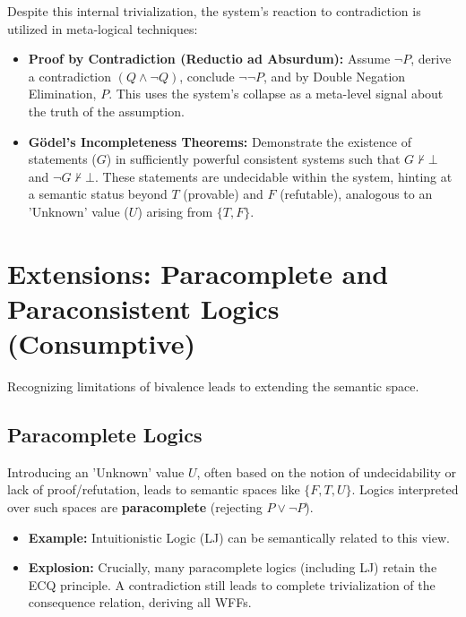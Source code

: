 	Despite this internal trivialization, the system's reaction to contradiction is utilized in meta-logical techniques:
	\begin{itemize}
		\item \textbf{Proof by Contradiction (Reductio ad Absurdum):} Assume $\neg P$, derive a contradiction $(Q \land \neg Q)$, conclude $\neg \neg P$, and by Double Negation Elimination, $P$. This uses the system's collapse as a meta-level signal about the truth of the assumption.
		\item \textbf{Gödel's Incompleteness Theorems:} Demonstrate the existence of statements ($G$) in sufficiently powerful consistent systems such that $G \nvdash \bot$ and $\neg G \nvdash \bot$. These statements are undecidable within the system, hinting at a semantic status beyond $T$ (provable) and $F$ (refutable), analogous to an 'Unknown' value ($U$) arising from $\{T, F\}$.
	\end{itemize}
	
	\section{Extensions: Paracomplete and Paraconsistent Logics (Consumptive)}
	
	Recognizing limitations of bivalence leads to extending the semantic space.
	
	\subsection{Paracomplete Logics}
	Introducing an 'Unknown' value $U$, often based on the notion of undecidability or lack of proof/refutation, leads to semantic spaces like $\{F, T, U\}$. Logics interpreted over such spaces are \textbf{paracomplete} (rejecting $P \lor \neg P$).
	\begin{itemize}
		\item \textbf{Example:} Intuitionistic Logic (LJ) can be semantically related to this view.
		\item \textbf{Explosion:} Crucially, many paracomplete logics (including LJ) retain the ECQ principle. A contradiction still leads to complete trivialization of the consequence relation, deriving all WFFs.
	\end{itemize}
	
